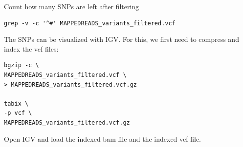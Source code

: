 \documentclass[11pt]{article}
\begin{document}
Count how many SNPs are left after filtering


\begin{verbatim}
grep -v -c '^#' MAPPEDREADS_variants_filtered.vcf
\end{verbatim}

The SNPs can be visualized with IGV. For this, we first need to
compress and index the vcf files: 


\begin{verbatim}
bgzip -c \
MAPPEDREADS_variants_filtered.vcf \
> MAPPEDREADS_variants_filtered.vcf.gz

tabix \
-p vcf \
MAPPEDREADS_variants_filtered.vcf.gz
\end{verbatim}

Open IGV and load the indexed bam file and the indexed vcf file.
\end{document}
